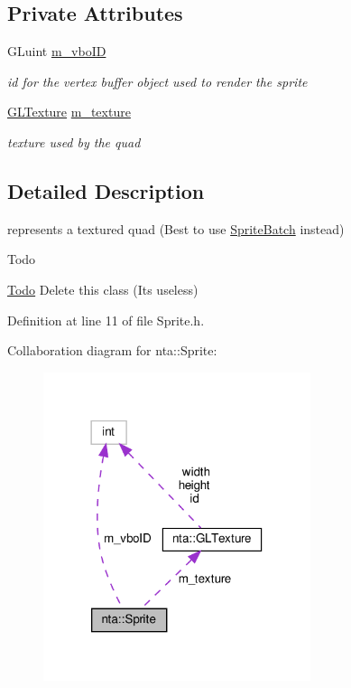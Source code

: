 \subsection*{Private Attributes}
\begin{DoxyCompactItemize}
\item 
\mbox{\label{classnta_1_1Sprite_a2d26de75fa95be871b3143847e22155c}} 
G\+Luint \hyperlink{classnta_1_1Sprite_a2d26de75fa95be871b3143847e22155c}{m\+\_\+vbo\+ID}
\begin{DoxyCompactList}\small\item\em id for the vertex buffer object used to render the sprite \end{DoxyCompactList}\item 
\mbox{\label{classnta_1_1Sprite_ac4fe2c6e0e34d133f5966a3ddc7a583e}} 
\hyperlink{structnta_1_1GLTexture}{G\+L\+Texture} \hyperlink{classnta_1_1Sprite_ac4fe2c6e0e34d133f5966a3ddc7a583e}{m\+\_\+texture}
\begin{DoxyCompactList}\small\item\em texture used by the quad \end{DoxyCompactList}\end{DoxyCompactItemize}


\subsection{Detailed Description}
represents a textured quad (Best to use \hyperlink{classnta_1_1SpriteBatch}{Sprite\+Batch} instead) \begin{DoxyRefDesc}{Todo}
\item[\hyperlink{todo__todo000012}{Todo}]Delete this class (It\textquotesingle{}s useless) \end{DoxyRefDesc}


Definition at line 11 of file Sprite.\+h.



Collaboration diagram for nta\+:\+:Sprite\+:\nopagebreak
\begin{figure}[H]
\begin{center}
\leavevmode
\includegraphics[width=222pt]{d8/da7/classnta_1_1Sprite__coll__graph}
\end{center}
\end{figure}


